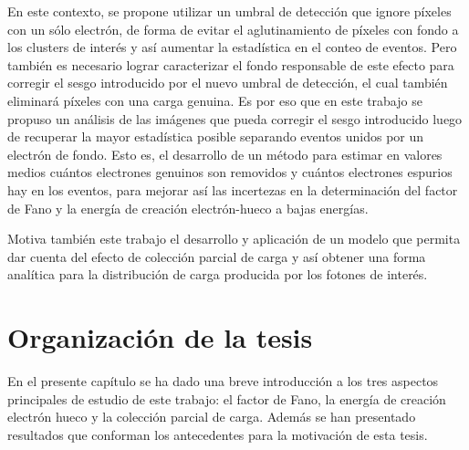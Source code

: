 En este contexto, se propone utilizar un umbral de detección que ignore píxeles con un sólo electrón, de forma de evitar el aglutinamiento de píxeles con fondo a los clusters de interés y así aumentar la estadística en el conteo de eventos. Pero también es necesario lograr caracterizar el fondo responsable de este efecto para corregir el sesgo introducido por el nuevo umbral de detección, el cual también eliminará píxeles con una carga genuina.
Es por eso que en este trabajo se propuso un análisis de las imágenes que pueda corregir el sesgo introducido luego de recuperar la mayor estadística posible separando eventos unidos por un electrón de fondo. 
Esto es, el desarrollo de un método para estimar en valores medios cuántos electrones genuinos son removidos y cuántos electrones espurios hay en los eventos, para mejorar así las incertezas en la determinación del factor de Fano y la energía de creación electrón-hueco a bajas energías.

Motiva también este trabajo el desarrollo y aplicación de un modelo que permita dar cuenta del efecto de colección parcial de carga y así obtener una forma analítica para la distribución de carga producida por los fotones de interés.

\section{Organización de la tesis}
\noindent En el presente capítulo se ha dado una breve introducción a los tres aspectos principales de estudio de este trabajo: el factor de Fano, la energía de creación electrón hueco y la colección parcial de carga. Además se han presentado resultados que conforman los antecedentes para la motivación de esta tesis.


